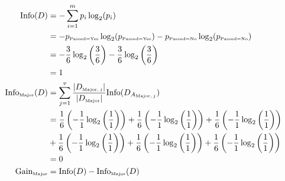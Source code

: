 \documentclass[
english,
smallborders
]{i6prcsht}
\newcommand{\OfSpecificValue}[3]{_{\text{\tiny #1#2#3}}}
\newcommand{\OfAttribute}[1]{_{\text{\tiny #1}}}
\begin{document}
\begin{solution}
	\begin{alignat*}{2}
		\text{Info}(D)                    & = -\sum_{i=1}^{m}p_i \log_2(p_i)                                                                                                                                                                                     \\
		                                  & = -p\OfSpecificValue{Passed}{=}{Yes} \log_2(p\OfSpecificValue{Passed}{=}{Yes})- p\OfSpecificValue{Passed}{=}{No} \log_2(p\OfSpecificValue{Passed}{=}{No})                                                            \\
		                                  & = -\frac{3}{6} \log_2\left(\frac{3}{6}\right) - \frac{3}{6} \log_2\left(\frac{3}{6}\right)                                                                                                                           \\
		                                  & = 1                                                                                                                                                                                                                  \\
		\text{Info}\OfAttribute{Major}(D) & = \sum_{j=1}^v \frac{|D\OfAttribute{Major$,j$}|}{|D\OfAttribute{Major}|} \text{Info}(D_{A\OfAttribute{Major$,j$}})                                                                                                   \\
		                                  & = \frac{1}{6} \left(-\frac{1}{1} \log_2\left(\frac{1}{1}\right)\right) + \frac{1}{6} \left(-\frac{1}{1} \log_2\left(\frac{1}{1}\right)\right) + \frac{1}{6} \left(-\frac{1}{1} \log_2\left(\frac{1}{1}\right)\right) \\
		                                  & + \frac{1}{6} \left(-\frac{1}{1} \log_2\left(\frac{1}{1}\right)\right) + \frac{1}{6} \left(-\frac{1}{1} \log_2\left(\frac{1}{1}\right)\right) + \frac{1}{6} \left(-\frac{1}{1} \log_2\left(\frac{1}{1}\right)\right) \\
		                                  & = 0                                                                                                                                                                                                                  \\
		\text{Gain}\OfAttribute{Major}    & = \text{Info}(D) - \text{Info}\OfAttribute{Major}(D)                                                                                                                                                                 \\

\end{alignat*}
\end{solution}
\end{document}
